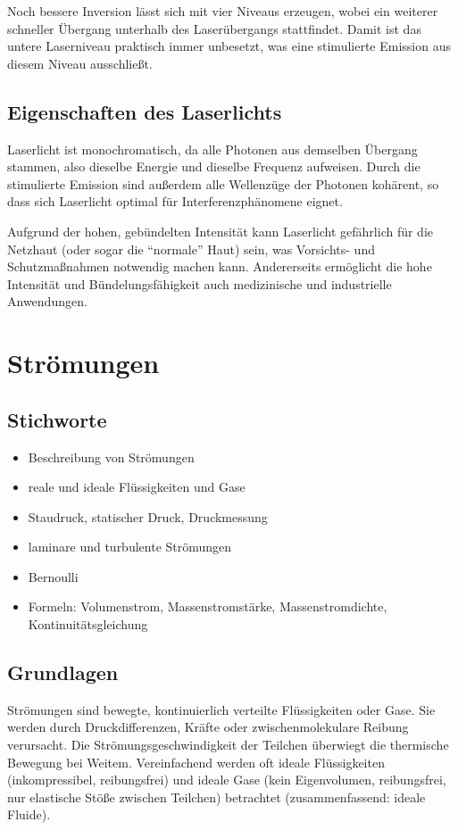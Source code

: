 \documentclass[a4paper]{scrartcl}
\begin{document}
Noch bessere Inversion lässt sich mit vier Niveaus erzeugen, wobei ein weiterer schneller Übergang unterhalb des Laserübergangs stattfindet. Damit ist das untere Laserniveau praktisch immer unbesetzt, was eine stimulierte Emission aus diesem Niveau ausschließt.

\subsection{Eigenschaften des Laserlichts}
Laserlicht ist monochromatisch, da alle Photonen aus demselben Übergang stammen, also dieselbe Energie und dieselbe Frequenz aufweisen. Durch die stimulierte Emission sind außerdem alle Wellenzüge der Photonen kohärent, so dass sich Laserlicht optimal für Interferenzphänomene eignet.

Aufgrund der hohen, gebündelten Intensität kann Laserlicht gefährlich für die Netzhaut (oder sogar die "`normale"' Haut) sein, was Vorsichts- und Schutzmaßnahmen notwendig machen kann. Andererseits ermöglicht die hohe Intensität und Bündelungsfähigkeit auch medizinische und industrielle Anwendungen.



\section{Strömungen}

\subsection{Stichworte}
\begin{itemize}[noitemsep]
  \item Beschreibung von Strömungen
  \item reale und ideale Flüssigkeiten und Gase
  \item Staudruck, statischer Druck, Druckmessung
  \item laminare und turbulente Strömungen
  \item Bernoulli
  \item Formeln: Volumenstrom, Massenstromstärke, Massenstromdichte, Kontinuitätsgleichung
\end{itemize}

\subsection{Grundlagen}
Strömungen sind bewegte, kontinuierlich verteilte Flüssigkeiten oder Gase. Sie werden durch Druckdifferenzen, Kräfte oder zwischenmolekulare Reibung verursacht. Die Strömungsgeschwindigkeit der Teilchen überwiegt die thermische Bewegung bei Weitem. Vereinfachend werden oft ideale Flüssigkeiten (inkompressibel, reibungsfrei) und ideale Gase (kein Eigenvolumen, reibungsfrei, nur elastische Stöße zwischen Teilchen) betrachtet (zusammenfassend: ideale Fluide). 
\end{document}
